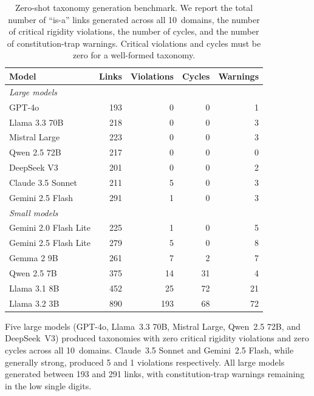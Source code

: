 \documentclass{IOS-Book-Article}
\begin{document}
\begin{table}[t]
  \caption{Zero-shot taxonomy generation benchmark.  We report the total
    number of ``is-a'' links generated across all 10~domains, the number
    of critical rigidity violations, the number of cycles, and the
    number of constitution-trap warnings.  Critical violations and
    cycles must be zero for a well-formed taxonomy.}
  \label{tab:benchmark}
  \centering
  \begin{tabular}{lrrrr}
    \toprule
    Model                 & Links & Violations & Cycles & Warnings \\
    \midrule
    \multicolumn{5}{l}{\textit{Large models}}                      \\
    GPT-4o                & 193   & 0          & 0      & 1        \\
    Llama 3.3 70B         & 218   & 0          & 0      & 3        \\
    Mistral Large         & 223   & 0          & 0      & 3        \\
    Qwen 2.5 72B          & 217   & 0          & 0      & 0        \\
    DeepSeek V3           & 201   & 0          & 0      & 2        \\
    Claude 3.5 Sonnet     & 211   & 5          & 0      & 3        \\
    Gemini 2.5 Flash      & 291   & 1          & 0      & 3        \\
    \midrule
    \multicolumn{5}{l}{\textit{Small models}}                      \\
    Gemini 2.0 Flash Lite & 225   & 1          & 0      & 5        \\
    Gemini 2.5 Flash Lite & 279   & 5          & 0      & 8        \\
    Gemma 2 9B            & 261   & 7          & 2      & 7        \\
    Qwen 2.5 7B           & 375   & 14         & 31     & 4        \\
    Llama 3.1 8B          & 452   & 25         & 72     & 21       \\
    Llama 3.2 3B          & 890   & 193        & 68     & 72       \\
    \bottomrule
  \end{tabular}
\end{table}

Five large models (GPT-4o, Llama~3.3 70B, Mistral Large, Qwen~2.5
72B, and DeepSeek~V3) produced taxonomies with zero critical rigidity
violations and zero cycles across all 10~domains.  Claude~3.5 Sonnet
and Gemini~2.5 Flash, while generally strong, produced 5 and 1
violations respectively.  All large models generated between 193 and
291 links, with constitution-trap warnings remaining in the low single
digits.
\end{document}
